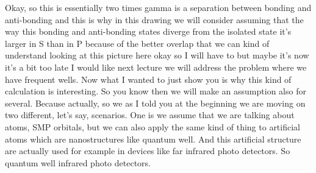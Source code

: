 Okay, so this is essentially two times gamma is a separation between bonding and anti-bonding and this is why in this drawing we will consider assuming that the way this bonding and anti-bonding states diverge from the isolated state it's larger in S than in P because of the better overlap that we can kind of understand looking at this picture here okay so I will have to but maybe it's now it's a bit too late I would like next lecture we will address the problem where we have frequent wells. Now what I wanted to just show you is why this kind of calculation is interesting. So you know then we will make an assumption also for several. Because actually, so we as I told you at the beginning we are moving on two different, let's say, scenarios. One is we assume that we are talking about atoms, SMP orbitals, but we can also apply the same kind of thing to artificial atoms which are nanostructures like quantum well. And this artificial structure are actually used for example in devices like far infrared photo detectors. So quantum well infrared photo detectors.\\
